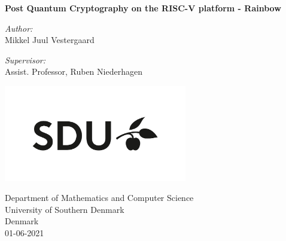 \documentclass[11pt,a4paper]{article}       		%
\begin{document}

    \begin{titlepage}
    \begin{center}
        \vspace*{1cm}
            
        \LARGE
        \textbf{Post Quantum Cryptography on the RISC-V platform - Rainbow}
            
        \vspace{2cm}
        
        \Large
        \emph{Author:}\\
        Mikkel Juul Vestergaard
        
        \vspace{0.5cm}
        \emph{Supervisor:}\\
        Assist. Professor, Ruben Niederhagen
        \vfill
        
        \vspace{0.8cm}
            
        \includegraphics[width=0.6\textwidth]{resources/SDU.jpeg}
            
        \Large
        Department of Mathematics and Computer Science\\
        University of Southern Denmark\\
        Denmark\\
        01-06-2021
            
    \end{center}
\end{titlepage}
\end{document}
